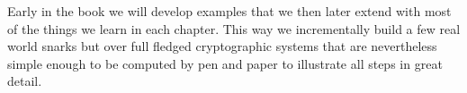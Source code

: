 Early in the book we will develop examples that we then later extend with most of the things we learn in each chapter. This way we incrementally build a few real world snarks but over full fledged cryptographic systems that are nevertheless simple enough to be computed by pen and paper to illustrate all steps in great detail.

\begin{comment}

\section{How to read this book}

Books and papers to read: XXXXXXXXXXX

Software to try: XXXXXXXXXXXXXXXXXXX

Correctly prescribing the best reading route for a beginner naturally requires individual diagnosis that depends on their prior knowledge and technical preparation.

\section{Cryptological Systems}
The science of information security is referred to as \textit{cryptology}. In the broadest sense, it deals with encryption and decryption processes, with digital signatures, identification protocols, cryptographic hash functions, secrets sharing, electronic voting procedures and electronic money. EXPAND

\section{SNARKS}



\section{complexity theory}
Before we deal with the mathematics behind zero knowledge proof systems, we must first clarify what is meant by the runtime of an algorithm or the time complexity of an entire mathematical problem. This is particularly important for us when we analyze the various snark systems...

For the reader who is interested in complexity theory, we recommend, or example 
or 
, as well as the references contained therein.

\subsection{Runtime complexity}
The runtime complexity of an algorithm describes, roughly speaking, the amount of elementary computation steps that this algorithm requires in order to solve a problem, depending on the size of the input data.


\end{comment}
